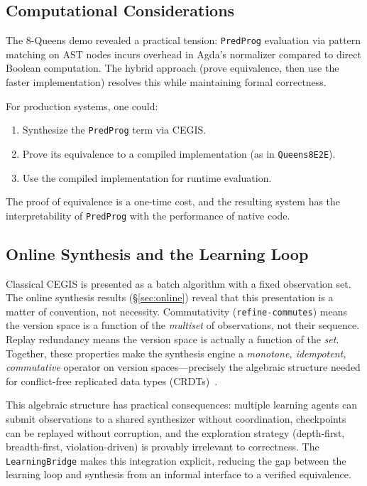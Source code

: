 \documentclass[9pt,a4paper]{article}
\theoremstyle{plain}
\theoremstyle{definition}
\theoremstyle{remark}
\begin{document}
\subsection{Computational Considerations}

The 8-Queens demo revealed a practical tension: \texttt{PredProg} evaluation via pattern matching on AST nodes incurs overhead in Agda's normalizer compared to direct Boolean computation.  The hybrid approach (prove equivalence, then use the faster implementation) resolves this while maintaining formal correctness.

For production systems, one could:
\begin{enumerate}
\item Synthesize the \texttt{PredProg} term via CEGIS.
\item Prove its equivalence to a compiled implementation (as in \texttt{Queens8E2E}).
\item Use the compiled implementation for runtime evaluation.
\end{enumerate}

\noindent The proof of equivalence is a one-time cost, and the resulting system has the interpretability of \texttt{PredProg} with the performance of native code.

\subsection{Online Synthesis and the Learning Loop}

Classical CEGIS is presented as a batch algorithm with a fixed observation set.  The online synthesis results (\S\ref{sec:online}) reveal that this presentation is a matter of convention, not necessity.
Commutativity (\texttt{refine-commutes}) means the version space is a function of the \emph{multiset} of observations, not their sequence.
Replay redundancy means the version space is actually a function of the \emph{set}.
Together, these properties make the synthesis engine a \emph{monotone, idempotent, commutative} operator on version spaces---precisely the algebraic structure needed for conflict-free replicated data types (CRDTs)~\cite{Shapiro2011}.

This algebraic structure has practical consequences: multiple learning agents can submit observations to a shared synthesizer without coordination, checkpoints can be replayed without corruption, and the exploration strategy (depth-first, breadth-first, violation-driven) is provably irrelevant to correctness.
The \texttt{LearningBridge} makes this integration explicit, reducing the gap between the learning loop and synthesis from an informal interface to a verified equivalence.
\end{document}
